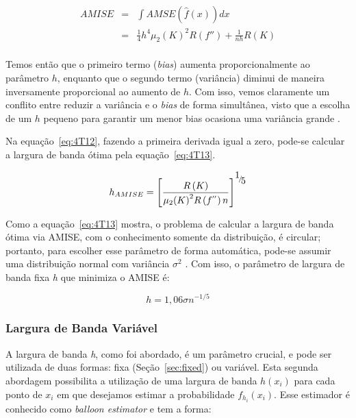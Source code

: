 \begin{equation}\label{eq:4T12}
\begin{array}{ccl}
 AMISE &=& \int {AMSE\left( {\hat f\left( x \right)} \right)dx}  \\
  &=& \frac{1}{4}{h^4}{\mu _2}{\left( K \right)^2}R\left( {f''} \right) + \frac{1}{{nh}}R\left( K \right) \\
 \end{array}
\end{equation}

Temos então que o primeiro termo (\emph{bias}) aumenta proporcionalmente ao parâmetro $h$, enquanto que o segundo termo (variância) diminui de maneira inversamente proporcional ao aumento de $h$. Com isso, vemos claramente um conflito entre reduzir a variância e o \emph{bias} de forma simultânea, visto que a escolha de um $h$ pequeno para garantir um menor bias ocasiona uma variância grande \cite{kernelthesis}.

Na equação~\ref{eq:4T12}, fazendo a primeira derivada igual a zero, pode-se calcular a largura de banda ótima pela equação~\ref{eq:4T13}.

\begin{equation}\label{eq:4T13}
{h_{AMISE}} = {\left[ {\frac{{R\left( K \right)}}{{{\mu _2}{{\left( K \right)}^2}R\left( {{f^{''}}} \right)n}}} \right]^{{\raise0.7ex\hbox{$1$} \!\mathord{\left/
 {\vphantom {1 5}}\right.\kern-\nulldelimiterspace}
\!\lower0.7ex\hbox{$5$}}}}
\end{equation}

Como a equação~\ref{eq:4T13} mostra, o problema de calcular a largura de banda ótima via AMISE, com o conhecimento somente da distribuição, é circular; portanto, para escolher esse parâmetro de forma automática, pode-se assumir uma distribuição normal com variância ${\sigma ^2}$ \cite{silverman1986density}. Com isso, o parâmetro de largura de banda fixa \emph{h} que minimiza o AMISE é:

\begin{equation}\label{eq:57}
    {h} = 1,06\sigma {n^{ - 1/5}}
\end{equation}

\subsubsection{Largura de Banda Variável}\label{sec:bandavariavel}

A largura de banda \emph{h}, como foi abordado, é um parâmetro crucial, e pode ser utilizada de duas formas: fixa (Seção~\ref{sec:fixed}) ou variável. Esta segunda abordagem possibilita a utilização de uma largura de banda $h({x_i})$  para cada ponto de ${x_i}$ em que desejamos estimar a probabilidade ${f_{h_i}}\left( {{x_i}} \right)$. Esse estimador é conhecido como \emph{balloon estimator} e tem a forma:

